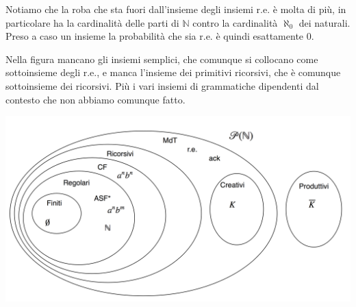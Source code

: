 \documentclass[a4paper,titlepage]{article}
\theoremstyle{definition}
\newcommand{\N}{\mathbb{N}}
\begin{document}
Notiamo che la roba che sta fuori dall'insieme degli insiemi r.e. è molta di più, in particolare ha la cardinalità delle parti di $\N$ contro la cardinalità $\aleph_0$ dei naturali. Preso a caso un insieme la probabilità che sia r.e. è quindi esattamente 0. 

Nella figura mancano gli insiemi semplici, che comunque si collocano come sottoinsieme degli r.e., e manca l'insieme dei primitivi ricorsivi, che è comunque sottoinsieme dei ricorsivi. Più i vari insiemi di grammatiche dipendenti dal contesto che non abbiamo comunque fatto. 

\includegraphics[width=\textwidth]{gerarchia-chomsky}
\end{document}
